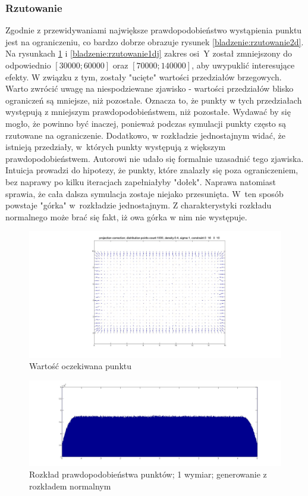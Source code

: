 \documentclass{mini}
\begin{document}
\subsubsection*{Rzutowanie}
Zgodnie z przewidywaniami największe prawdopodobieństwo wystąpienia punktu jest na ograniczeniu, co bardzo dobrze obrazuje rysunek \ref{bladzenie:rzutowanie2d}. Na rysunkach \ref{bladzenie:rzutowanie1dn} i \ref{bladzenie:rzutowanie1dj} zakres osi~Y został zmniejszony do odpowiednio $[30000;60000]$ oraz $[70000;140000]$, aby uwypuklić interesujące efekty. W związku z tym, zostały "ucięte" wartości przedziałów brzegowych. Warto zwrócić uwagę na niespodziewane zjawisko - wartości przedziałów blisko ograniczeń są mniejsze, niż pozostałe. Oznacza to, że punkty w tych przedziałach występują z mniejszym prawdopodobieństwem, niż pozostałe. Wydawać by się mogło, że powinno być inaczej, ponieważ podczas symulacji punkty często są rzutowane na ograniczenie. Dodatkowo, w rozkładzie jednostajnym widać, że istnieją przedziały, w~których punkty występują z większym prawdopodobieństwem. Autorowi nie udało się formalnie uzasadnić tego zjawiska. Intuicja prowadzi do hipotezy, że punkty, które znalazły się poza ograniczeniem, bez naprawy po kilku iteracjach zapełniałyby "dołek". Naprawa natomiast sprawia, że cała dalsza symulacja zostaje niejako przesunięta. W~ten sposób powstaje "górka" w~rozkładzie jednostajnym. Z charakterystyki rozkładu normalnego może brać się fakt, iż owa górka w nim nie występuje.

\begin{figure}[H]
\centering
\includegraphics[width=\textwidth]{projection2dprzesuniecie}
\caption{Wartość oczekiwana punktu}
\end{figure}

\begin{figure}[H]
\centering
\includegraphics[width=\textwidth]{p_n_50M_1__5_5}
\caption{Rozkład prawdopodobieństwa punktów; 1 wymiar; generowanie z rozkładem normalnym}
\label{bladzenie:rzutowanie1dn}
\end{figure}
\end{document}
